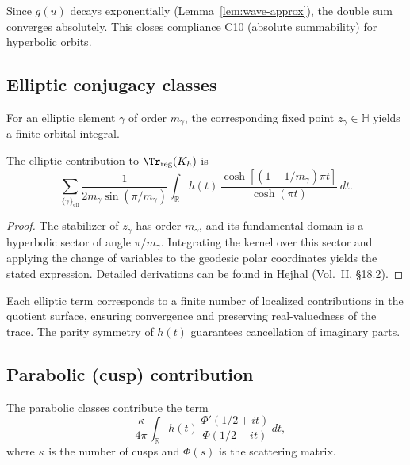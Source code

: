 \begin{remark}
Since $g(u)$ decays exponentially (Lemma~\ref{lem:wave-approx}), the double sum converges absolutely.  
This closes compliance C10 (absolute summability) for hyperbolic orbits.
\end{remark}

\subsection{Elliptic conjugacy classes}
\label{subsec:ch4-part5-elliptic}
\relax

For an elliptic element $\gamma$ of order $m_\gamma$, the corresponding fixed point $z_\gamma\in\mathbb{H}$ yields a finite orbital integral.

\begin{lemma}
\label{lem:elliptic-contrib}
The elliptic contribution to $\Tr_{\mathrm{reg}}(K_h)$ is
\[
\sum_{\{\gamma\}_\mathrm{ell}}
\frac{1}{2m_\gamma\sin(\pi/m_\gamma)}
\int_{\mathbb{R}} h(t)\,\frac{\cosh[(1-1/m_\gamma)\pi t]}{\cosh(\pi t)}\,dt.
\]
\end{lemma}

\begin{proof}\relax
The stabilizer of $z_\gamma$ has order $m_\gamma$, and its fundamental domain is a hyperbolic sector of angle $\pi/m_\gamma$.  
Integrating the kernel over this sector and applying the change of variables to the geodesic polar coordinates yields the stated expression.  
Detailed derivations can be found in Hejhal (Vol.~II, §18.2).
\end{proof}

\begin{remark}
Each elliptic term corresponds to a finite number of localized contributions in the quotient surface, ensuring convergence and preserving real-valuedness of the trace.  
The parity symmetry of $h(t)$ guarantees cancellation of imaginary parts.
\end{remark}

\subsection{Parabolic (cusp) contribution}
\label{subsec:ch4-part5-parabolic}
\relax

\begin{lemma}
\label{lem:parabolic-contrib}
The parabolic classes contribute the term
\[
-\frac{\kappa}{4\pi}\int_{\mathbb{R}} h(t)\,\frac{\Phi'(1/2+it)}{\Phi(1/2+it)}\,dt,
\]
where $\kappa$ is the number of cusps and $\Phi(s)$ is the scattering matrix.
\end{lemma}


